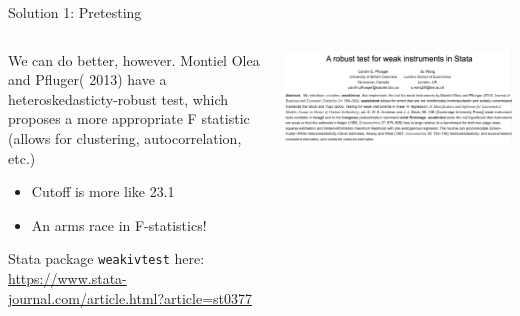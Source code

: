 \documentclass[notes,11pt, aspectratio=169]{beamer}
\newenvironment{wideitemize}{\itemize\addtolength{\itemsep}{10pt}}{\enditemize}
\begin{document}
\begin{frame}{Solution 1: Pretesting}
  \begin{columns}[T] %
    \begin{column}{0.5\textwidth}
      \begin{wideitemize}
      \item We can do better, however. Montiel Olea and Pfluger( 2013) have a heteroskedasticty-robust test, which proposes a more appropriate F statistic (allows for clustering, autocorrelation, etc.)
        \begin{itemize}
        \item Cutoff is more like 23.1
        \item An arms race in F-statistics!
        \end{itemize}
      \item Stata package \texttt{weakivtest} here: \url{https://www.stata-journal.com/article.html?article=st0377}
      \end{wideitemize}
    \end{column}
    \begin{column}{0.5\textwidth}
       \includegraphics[width=\linewidth]{images/pflueger_package.png}
    \end{column}
  \end{columns}
\end{frame}
\end{document}
